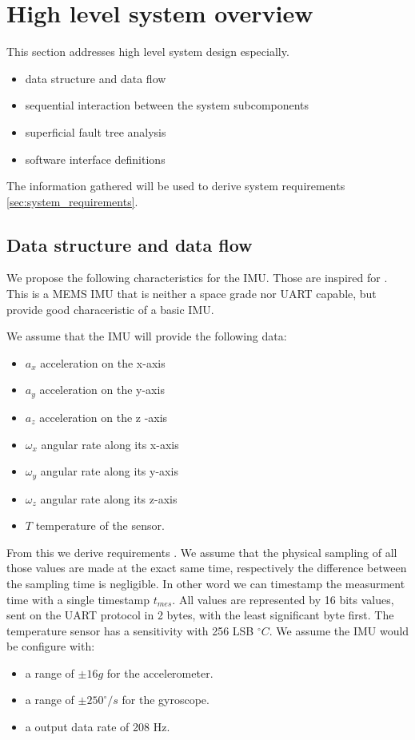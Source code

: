 \section{High level system overview}
This section addresses high level system design especially.
\begin{itemize}
    \item data structure and data flow
    \item sequential interaction between the system subcomponents
    \item superficial fault tree analysis
    \item software interface definitions
\end{itemize}
The information gathered will be used to derive system requirements \ref{sec:system_requirements}.

\subsection{Data structure and data flow}
We propose the following characteristics for the IMU. Those are inspired for \cite{lm6ds3}. This is a MEMS IMU that is neither a space grade nor UART capable, but provide good characeristic of a basic IMU.

We assume that the IMU will provide the following data:
\begin{itemize}
    \item $a_x$ acceleration on the x-axis
    \item $a_y$ acceleration on the y-axis
    \item $a_z$ acceleration on the z -axis
    \item $\omega_x$ angular rate along its x-axis
    \item $\omega_y$ angular rate along its y-axis
    \item $\omega_z$ angular rate along its z-axis
    \item $T$ temperature of the sensor.
\end{itemize}
From this we derive requirements .
We assume that the physical sampling of all those values are made at the exact same time, respectively the difference between the sampling time is negligible.
In other word we can timestamp the measurment time with a single timestamp $t_{mes}$.
All values are represented by 16 bits values, sent on the UART protocol in 2 bytes, with the least significant byte first.
The temperature sensor has a sensitivity with 256 LSB $^{\circ}C$.
We assume the IMU would be configure with:
\begin{itemize}
    \item a range of $\pm 16g$ for the accelerometer.
    \item a range of $\pm 250^{\circ}/s$ for the gyroscope.
    \item a output data rate of 208 Hz.
\end{itemize}

